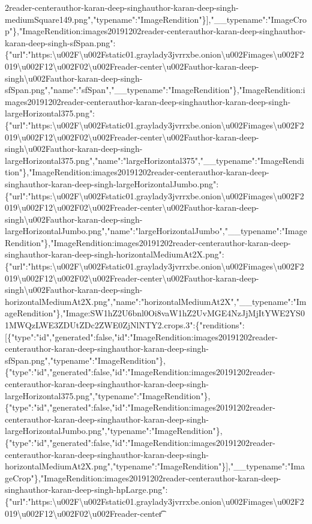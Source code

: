 2reader-centerauthor-karan-deep-singhauthor-karan-deep-singh-mediumSquare149.png","typename":"ImageRendition"\}{]},"\_\_typename":"ImageCrop"\},"ImageRendition:images20191202reader-centerauthor-karan-deep-singhauthor-karan-deep-singh-sfSpan.png":\{"url":"https:\textbackslash{}u002F\textbackslash{}u002Fstatic01.graylady3jvrrxbe.onion\textbackslash{}u002Fimages\textbackslash{}u002F2019\textbackslash{}u002F12\textbackslash{}u002F02\textbackslash{}u002Freader-center\textbackslash{}u002Fauthor-karan-deep-singh\textbackslash{}u002Fauthor-karan-deep-singh-sfSpan.png","name":"sfSpan","\_\_typename":"ImageRendition"\},"ImageRendition:images20191202reader-centerauthor-karan-deep-singhauthor-karan-deep-singh-largeHorizontal375.png":\{"url":"https:\textbackslash{}u002F\textbackslash{}u002Fstatic01.graylady3jvrrxbe.onion\textbackslash{}u002Fimages\textbackslash{}u002F2019\textbackslash{}u002F12\textbackslash{}u002F02\textbackslash{}u002Freader-center\textbackslash{}u002Fauthor-karan-deep-singh\textbackslash{}u002Fauthor-karan-deep-singh-largeHorizontal375.png","name":"largeHorizontal375","\_\_typename":"ImageRendition"\},"ImageRendition:images20191202reader-centerauthor-karan-deep-singhauthor-karan-deep-singh-largeHorizontalJumbo.png":\{"url":"https:\textbackslash{}u002F\textbackslash{}u002Fstatic01.graylady3jvrrxbe.onion\textbackslash{}u002Fimages\textbackslash{}u002F2019\textbackslash{}u002F12\textbackslash{}u002F02\textbackslash{}u002Freader-center\textbackslash{}u002Fauthor-karan-deep-singh\textbackslash{}u002Fauthor-karan-deep-singh-largeHorizontalJumbo.png","name":"largeHorizontalJumbo","\_\_typename":"ImageRendition"\},"ImageRendition:images20191202reader-centerauthor-karan-deep-singhauthor-karan-deep-singh-horizontalMediumAt2X.png":\{"url":"https:\textbackslash{}u002F\textbackslash{}u002Fstatic01.graylady3jvrrxbe.onion\textbackslash{}u002Fimages\textbackslash{}u002F2019\textbackslash{}u002F12\textbackslash{}u002F02\textbackslash{}u002Freader-center\textbackslash{}u002Fauthor-karan-deep-singh\textbackslash{}u002Fauthor-karan-deep-singh-horizontalMediumAt2X.png","name":"horizontalMediumAt2X","\_\_typename":"ImageRendition"\},"Image:SW1hZ2U6bnl0Oi8vaW1hZ2UvMGE4NzJjMjItYWE2YS01MWQzLWE3ZDUtZDc2ZWE0ZjNlNTY2.crops.3":\{"renditions":{[}\{"type":"id","generated":false,"id":"ImageRendition:images20191202reader-centerauthor-karan-deep-singhauthor-karan-deep-singh-sfSpan.png","typename":"ImageRendition"\},\{"type":"id","generated":false,"id":"ImageRendition:images20191202reader-centerauthor-karan-deep-singhauthor-karan-deep-singh-largeHorizontal375.png","typename":"ImageRendition"\},\{"type":"id","generated":false,"id":"ImageRendition:images20191202reader-centerauthor-karan-deep-singhauthor-karan-deep-singh-largeHorizontalJumbo.png","typename":"ImageRendition"\},\{"type":"id","generated":false,"id":"ImageRendition:images20191202reader-centerauthor-karan-deep-singhauthor-karan-deep-singh-horizontalMediumAt2X.png","typename":"ImageRendition"\}{]},"\_\_typename":"ImageCrop"\},"ImageRendition:images20191202reader-centerauthor-karan-deep-singhauthor-karan-deep-singh-hpLarge.png":\{"url":"https:\textbackslash{}u002F\textbackslash{}u002Fstatic01.graylady3jvrrxbe.onion\textbackslash{}u002Fimages\textbackslash{}u002F2019\textbackslash{}u002F12\textbackslash{}u002F02\textbackslash{}u002Freader-center\t